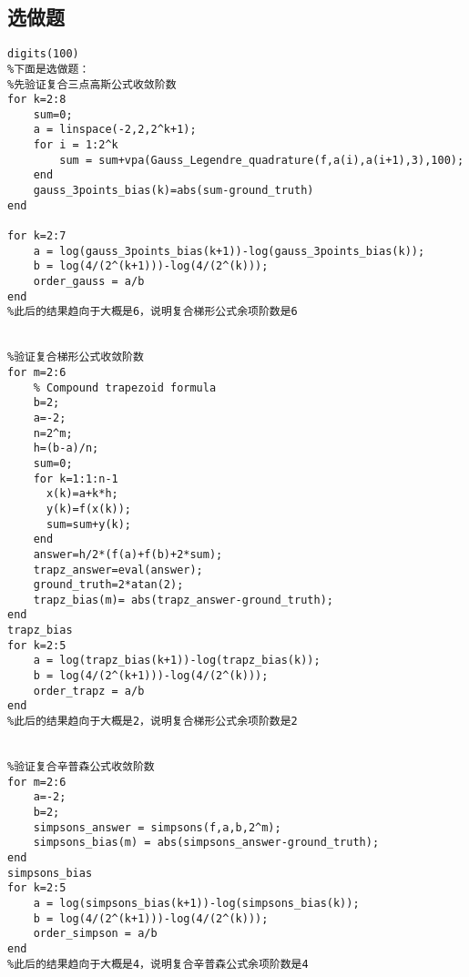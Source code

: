 \documentclass{ctexart}%
\begin{document}
\subsection{选做题}
\begin{lstlisting}
digits(100)
%下面是选做题：
%先验证复合三点高斯公式收敛阶数
for k=2:8
    sum=0;
    a = linspace(-2,2,2^k+1);
    for i = 1:2^k
        sum = sum+vpa(Gauss_Legendre_quadrature(f,a(i),a(i+1),3),100);
    end
    gauss_3points_bias(k)=abs(sum-ground_truth)
end

for k=2:7
    a = log(gauss_3points_bias(k+1))-log(gauss_3points_bias(k));
    b = log(4/(2^(k+1)))-log(4/(2^(k)));
    order_gauss = a/b
end
%此后的结果趋向于大概是6，说明复合梯形公式余项阶数是6


%验证复合梯形公式收敛阶数
for m=2:6
    % Compound trapezoid formula
    b=2;
    a=-2;
    n=2^m;
    h=(b-a)/n;
    sum=0;
    for k=1:1:n-1
      x(k)=a+k*h;
      y(k)=f(x(k));
      sum=sum+y(k);
    end
    answer=h/2*(f(a)+f(b)+2*sum);
    trapz_answer=eval(answer);
    ground_truth=2*atan(2);
    trapz_bias(m)= abs(trapz_answer-ground_truth);
end
trapz_bias
for k=2:5
    a = log(trapz_bias(k+1))-log(trapz_bias(k));
    b = log(4/(2^(k+1)))-log(4/(2^(k)));
    order_trapz = a/b
end
%此后的结果趋向于大概是2，说明复合梯形公式余项阶数是2


%验证复合辛普森公式收敛阶数
for m=2:6
    a=-2;
    b=2;
    simpsons_answer = simpsons(f,a,b,2^m);
    simpsons_bias(m) = abs(simpsons_answer-ground_truth);
end
simpsons_bias
for k=2:5
    a = log(simpsons_bias(k+1))-log(simpsons_bias(k));
    b = log(4/(2^(k+1)))-log(4/(2^(k)));
    order_simpson = a/b
end
%此后的结果趋向于大概是4，说明复合辛普森公式余项阶数是4
\end{lstlisting}
\end{document}
